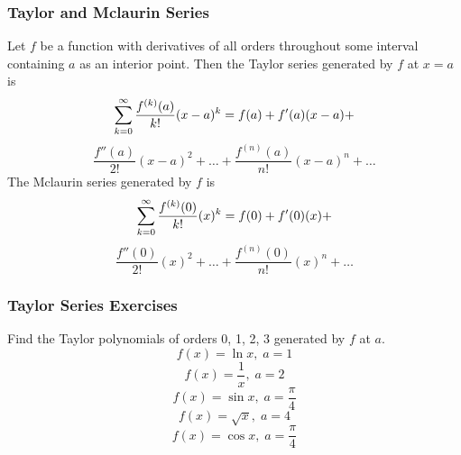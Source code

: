 \documentclass[xcolor=dvipsnames]{beamer}
\begin{document}
  \begin{frame}
    \frametitle{Taylor and Mclaurin Series}
    Let $f$ be a function with derivatives of all orders throughout
    some interval containing $a$ as an interior point. Then the
    \alert{Taylor series} generated by $f$ at $x=a$ is
    \begin{equation}
      \label{eq:oetaenis}
      \sum_{k=0}^{\infty}\frac{f^{(k)}(a)}{k!}(x-a)^{k}=f(a)+f'(a)(x-a)+\notag
    \end{equation}
    \begin{equation}
      \label{eq:ikooveiv}
      \frac{f''(a)}{2!}(x-a)^{2}+{\ldots}+\frac{f^{(n)}(a)}{n!}(x-a)^{n}+{\ldots}
    \end{equation}
    The \alert{Mclaurin series} generated by $f$ is
    \begin{equation}
      \label{eq:ohyoobip}
      \sum_{k=0}^{\infty}\frac{f^{(k)}(0)}{k!}(x)^{k}=f(0)+f'(0)(x)+\notag
    \end{equation}
    \begin{equation}
      \label{eq:tolokaav}
      \frac{f''(0)}{2!}(x)^{2}+{\ldots}+\frac{f^{(n)}(0)}{n!}(x)^{n}+{\ldots}
    \end{equation}
  \end{frame}

  \begin{frame}
    \frametitle{Taylor Series Exercises}
Find the Taylor polynomials of orders 0, 1, 2, 3 generated by $f$
at $a$.
\begin{equation}
\label{eq:chaithie}
f(x)=\ln{}x,\;a=1
\end{equation}
\begin{equation}
\label{eq:oorohkao}
f(x)=\frac{1}{x},\;a=2
\end{equation}
\begin{equation}
\label{eq:foigacoo}
f(x)=\sin{}x,\;a=\frac{\pi}{4}
\end{equation}
\begin{equation}
\label{eq:sishahgh}
f(x)=\sqrt{x},\;a=4
\end{equation}
\begin{equation}
  \label{eq:eighetog}
f(x)=\cos{}x,\;a=\frac{\pi}{4}
\end{equation}
\end{frame}
\end{document}

